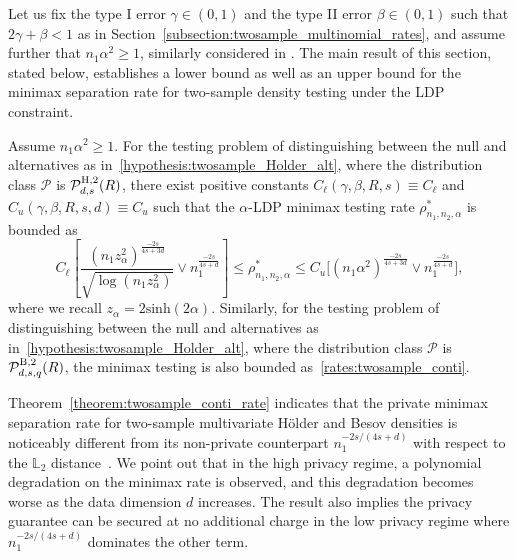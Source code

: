 \documentclass[twoside,11pt]{article}
\newcommand{\distClassGeneric}{\mathcal{P}}
\newcommand{\Ell}{\mathbb{L}}
\newcommand{\EllTwo}{\Ell_2} %
\newcommand{\dimDensity}{d} %
\newcommand{\sampleSize}{n}
\newcommand{\smoothness}{s}
\newcommand{\ballRadius}{R}
\newcommand{\privacyParameter}{\alpha} %
\newcommand{\maxErrorTypeTwo}{\beta} %
\newcommand{\maxErrorTypeOne}{\gamma} %
\newcommand{\besovParamMicroscope}{q}
\newcommand{\pBesovTs}{ %
	\distClassGeneric_{%
		\dimDensity, \smoothness, \besovParamMicroscope
	}^{%
		\mathrm{B,2}
	}
	(\ballRadius)
}
\newcommand{\pHolderTs}{ %
	\distClassGeneric_{%
		\dimDensity, \smoothness
	}^{%
		\mathrm{H,2}
	}
	(\ballRadius)
}
\begin{document}
Let us fix the type I error $\maxErrorTypeOne \in (0,1)$ and the type II error $\maxErrorTypeTwo \in (0,1)$ such that $2\maxErrorTypeOne + \maxErrorTypeTwo < 1$ as in Section~\ref{subsection:twosample_multinomial_rates},
and
assume further that $\sampleSize_1 \privacyParameter^2 \geq 1$,
similarly considered in \cite{Lam-Weil2021MinimaxConstraint}.
The main result of this section, stated below, establishes a lower bound as well as an upper bound for the minimax separation rate for two-sample density testing under the LDP constraint.

\begin{theorem} \label{theorem:twosample_conti_rate}
	Assume $\sampleSize_1 \privacyParameter^2 \geq 1$.
	For the testing problem of distinguishing between the null and alternatives as in~\eqref{hypothesis:twosample_Holder_alt}, where the distribution class $\distClassGeneric$ is $\pHolderTs$,
	there exist positive constants
	$C_\ell(  \gamma, \beta, \ballRadius, \smoothness) \equiv C_\ell$
	and
	$C_u(  \gamma, \beta, \ballRadius, \smoothness, \dimDensity) \equiv C_u$
	such that the $\privacyParameter$-LDP minimax testing rate 
	$\rho_{\sampleSize_1, \sampleSize_2, \privacyParameter}^\ast$ is bounded as
	\begin{equation}\label{rates:twosample_conti}
		C_\ell \left[
		\frac{(\sampleSize_1z_\privacyParameter^2)^{\frac{-2s}{4\smoothness+3\dimDensity}}}{\sqrt{\log(\sampleSize_1z_\privacyParameter^2)}}
		\vee
		\sampleSize_1^{\frac{-2s}{4\smoothness+\dimDensity}}
		\right]
		\leq
		\rho_{\sampleSize_1, \sampleSize_2, \privacyParameter}^\ast
		\leq
		C_u
		\bigl[
		(\sampleSize_1\privacyParameter^2)^{\frac{-2s}{4\smoothness+3\dimDensity}} 
		\vee
		\sampleSize_1^{\frac{-2s}{4\smoothness+\dimDensity}}
		\bigr],
	\end{equation}
	where we recall $z_\alpha = 2 \mathrm{sinh}(2\alpha)$.
	Similarly, for the testing problem of distinguishing between the null and alternatives as in~\eqref{hypothesis:twosample_Holder_alt}, where the distribution class $\distClassGeneric$ is $\pBesovTs$,
	the minimax testing is also bounded as~\eqref{rates:twosample_conti}.
	
\end{theorem}
\noindent
Theorem~\ref{theorem:twosample_conti_rate} indicates that the private minimax separation rate for two-sample multivariate H\"{o}lder and Besov densities is noticeably different from its non-private counterpart $\sampleSize_1^{-2s/(4\smoothness+\dimDensity)}$ with respect to the $\EllTwo$ distance~\citep{Arias-Castro2018RememberDimension, kim_minimax_2022}.
%
We point out that in the high privacy regime, a polynomial degradation on the minimax rate is observed,
and this degradation becomes worse as the data dimension $\dimDensity$ increases.
The result also implies the privacy guarantee can be secured at no additional charge in the low privacy regime where $\sampleSize_1^{-2s/(4\smoothness+\dimDensity)}$ dominates the other term.
\end{document}
